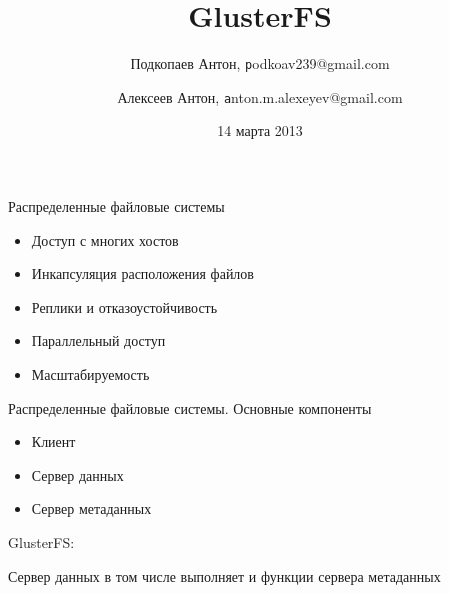 \documentclass{beamer}
\begin{document}
\title
[GlusterFS]
{GlusterFS}
\author
[Подкопаев Антон, Алексеев Антон]
{
Подкопаев Антон, \texttt podkoav239@gmail.com\\
\and
Алексеев Антон, \texttt anton.m.alexeyev@gmail.com
}
\date [14-03-13]{14 марта 2013}

\begin{frame}[plain]
	\titlepage
\end{frame}

\begin{frame}{Распределенные файловые системы}
	\begin{itemize}
		\item Доступ с многих хостов
		
		\item Инкапсуляция расположения файлов
		
		\item Реплики и отказоустойчивость
		
		\item Параллельный доступ
		
		\item Масштабируемость

	\end{itemize}
\end{frame}

\begin{frame}{Распределенные файловые системы. Основные компоненты}
	\begin{itemize}
		\item Клиент
		\item Сервер данных
		\item Сервер метаданных
	\end{itemize}
	\pause
	GlusterFS:

	Сервер данных в том числе выполняет и функции сервера метаданных
\end{frame}
\end{document}
